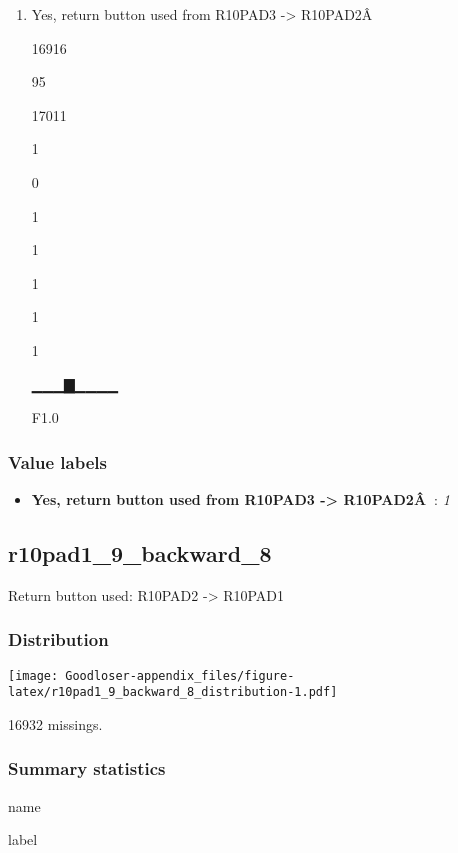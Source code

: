 \documentclass[]{book}
\providecommand{\tightlist}{%
  \setlength{\itemsep}{0pt}\setlength{\parskip}{0pt}}
\begin{document}
\begin{enumerate}
\def\labelenumi{\arabic{enumi}.}
\tightlist
\item
  Yes, return button used from R10PAD3 -\textgreater{} R10PAD2Â

  16916

  95

  17011

  1

  0

  1

  1

  1

  1

  1

  ▁▁▁▇▁▁▁▁

  F1.0
\end{enumerate}

\subsubsection{Value labels}\label{r10pad1_9_backward_7_labels}

\begin{itemize}
\tightlist
\item
  \textbf{Yes, return button used from R10PAD3 -\textgreater{}
  R10PAD2Â~}: \emph{1}
\end{itemize}

\subsection{r10pad1\_9\_backward\_8}\label{r10pad1_9_backward_8}

Return button used: R10PAD2 -\textgreater{} R10PAD1

\subsubsection{Distribution}\label{r10pad1_9_backward_8_distribution}

\texttt{[image: Goodloser-appendix\_files/figure-latex/r10pad1\_9\_backward\_8\_distribution-1.pdf]}

16932 missings.

\subsubsection{Summary statistics}\label{r10pad1_9_backward_8_summary}

name

label
\end{document}
